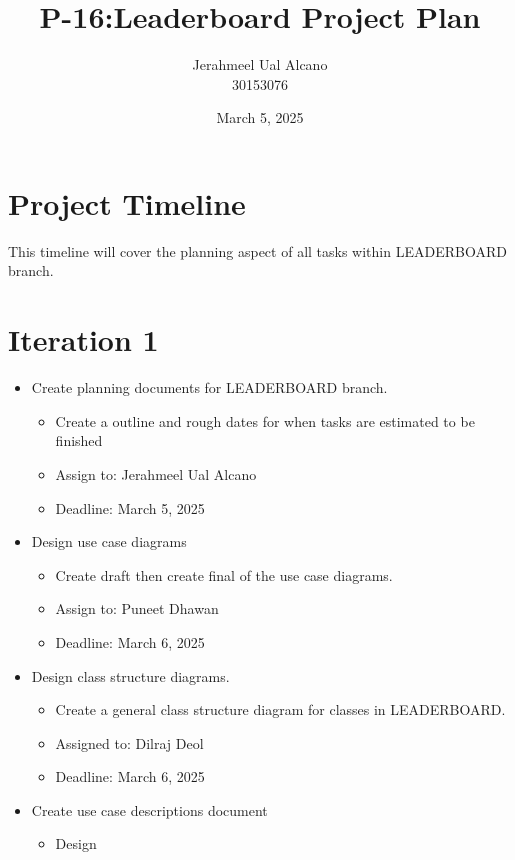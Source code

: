 \documentclass{report}
\title{\huge{P-16:}Leaderboard Project Plan}
\author{Jerahmeel Ual Alcano \\ 30153076}
\date{March 5, 2025}
\begin{document}
\maketitle
\section*{Project Timeline}
This timeline will cover the planning aspect of all tasks within LEADERBOARD branch.

\section{Iteration 1}
\begin{itemize}
    \item Create planning documents for LEADERBOARD branch.
    \begin{itemize}
        \item Create a outline and rough dates for when tasks are estimated to be finished
        \item Assign to: Jerahmeel Ual Alcano
        \item Deadline: March 5, 2025
    \end{itemize}
    \item Design use case diagrams
    \begin{itemize}
        \item Create draft then create final of the use case diagrams.
        \item Assign to: Puneet Dhawan
        \item Deadline: March 6, 2025
    \end{itemize}
    \item Design class structure diagrams.
    \begin{itemize}
        \item Create a general class structure diagram for classes in LEADERBOARD.
        \item Assigned to: Dilraj Deol
        \item Deadline: March 6, 2025
    \end{itemize}
    \item Create use case descriptions document
    \begin{itemize}
        \item Design 
    \end{itemize}
\end{itemize}
\end{document}
